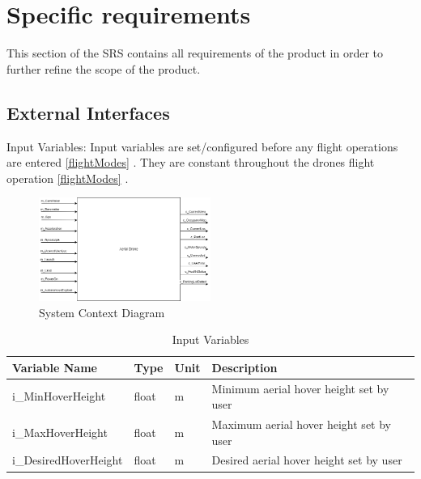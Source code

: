 \documentclass{article}
\begin{document}
\section{Specific requirements }
\label{sec:Req}
This section of the SRS contains all requirements of the product in order to further refine the scope of the product.

\subsection{External Interfaces}
Input Variables: Input variables are set/configured before any flight operations are entered \ref{flightModes} . They are constant throughout the drones flight operation \ref{flightModes} .


\begin{figure}[!h]
  \begin{center} 
  \caption{System Context Diagram} 
 
        \includegraphics[width=0.5\textwidth]{ContextDiagram.png}
  \end{center}
\end{figure}



\begin{table}[!h]
\begin{center}
\caption {Input Variables} \label{tab:title}
\label{InputVariables}
\begin{tabular}{ | m{3cm} | m{2cm} | m{2cm} | m{6cm} | } 
\hline
 Variable Name & Type & Unit & Description \\ 
 \hline
 i\_MinHoverHeight & float	&m	& Minimum aerial hover height set by user\\
\hline i\_MaxHoverHeight & float	&m	& Maximum aerial hover height set by user\\
\hline i\_DesiredHoverHeight & float	&m	& Desired aerial hover height set by user\\
\hline 
\end{tabular}
\end{center}
\end{table}
\end{document}
